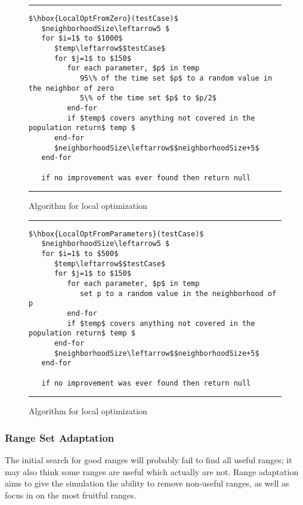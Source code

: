 \documentclass[runningheads]{llncs}
\begin{document}
\begin{figure}[h!]
\begin{center}
\hrule
\medskip
\begin{Verbatim}[fontfamily=tt, xleftmargin=10pt, commandchars=\\\{\},
codes={\catcode`$=3\catcode`^=7\catcode`_=8}]
$\hbox{LocalOptFromZero}(testCase)$
   $neighborhoodSize\leftarrow5 $
   for $i=1$ to $1000$ 
      $temp\leftarrow$$testCase$
      for $j=1$ to $150$
         for each parameter, $p$ in temp
            95\% of the time set $p$ to a random value in the neighbor of zero
            5\% of the time set $p$ to $p/2$
         end-for     
         if $temp$ covers anything not covered in the population return$ temp $
      end-for
      $neighborhoodSize\leftarrow$$neighborhoodSize+5$
   end-for
		
   if no improvement was ever found then return null
\end{Verbatim}
\hrule
\end{center}
\caption{Algorithm for local optimization \label{fig:lcOptFZ}}
\end{figure}

\begin{figure}[h!]
\begin{center}
\hrule
\medskip
\begin{Verbatim}[fontfamily=tt, xleftmargin=10pt, commandchars=\\\{\},
codes={\catcode`$=3\catcode`^=7\catcode`_=8}]
$\hbox{LocalOptFromParameters}(testCase)$
   $neighborhoodSize\leftarrow5 $
   for $i=1$ to $500$ 
      $temp\leftarrow$$testCase$
      for $j=1$ to $150$
         for each parameter, $p$ in temp
            set p to a random value in the neighborhood of p
         end-for     
         if $temp$ covers anything not covered in the population return$ temp $
      end-for
      $neighborhoodSize\leftarrow$$neighborhoodSize+5$
   end-for
   
   if no improvement was ever found then return null
\end{Verbatim}
\hrule
\end{center}
\caption{Algorithm for local optimization \label{fig:lcOptFP}}
\end{figure}

\FloatBarrier

\subsubsection{Range Set Adaptation} The initial search for good ranges will probably fail to find all useful ranges; it may also think some ranges are useful which actually are not. Range adaptation aims to give the simulation the ability to remove non-useful ranges, as well as focus in on the most fruitful ranges.
\end{document}
